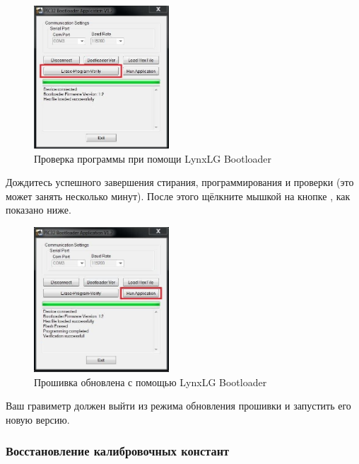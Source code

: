 \begin{figure}[H]
  \centering
  \includegraphics[width=0.45\textwidth]{figures/verifying_the_program_with_the_lynxlg_bootloader}
  \caption{Проверка программы при помощи LynxLG Bootloader}
  \label{fig:verifying_the_program_with_the_lynxlg_bootloader}
\end{figure}

Дождитесь успешного завершения стирания, программирования и проверки (это может
занять несколько минут). После этого щёлкните мышкой на кнопке , как показано ниже.

\begin{figure}[H]
  \centering
  \includegraphics[width=0.45\textwidth]{figures/upgrade_firmware_with_lynxlg_bootloader}
  \caption{Прошивка обновлена с помощью LynxLG Bootloader}
  \label{fig:upgrade_firmware_with_lynxlg_bootloader}
\end{figure}

Ваш гравиметр \cg{} должен выйти из режима обновления прошивки и запустить его новую версию.

\subsubsection{Восстановление калибровочных констант}

